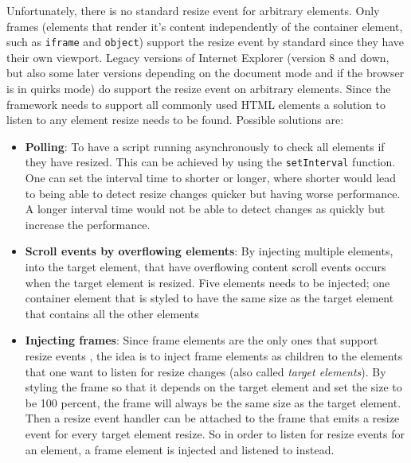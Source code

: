\documentclass[a4paper,11pt]{kth-mag}
\newcommand{\code}[1]{\texttt{#1}}
\begin{document}
          Unfortunately, there is no standard resize event for arbitrary \glspl{element}.
          Only frames (\glspl{element} that render it's content independently of the container \gls{element}, such as \code{iframe} and \code{object}) support the resize event by standard since they have their own \gls{viewport}.
          Legacy versions of Internet Explorer (version 8 and down, but also some later versions depending on the \gls{document} mode and if the \gls{browser} is in quirks mode) do support the resize event on arbitrary \glspl{element}.
          Since the framework needs to support all commonly used \gls{HTML} \glspl{element} a solution to listen to any \gls{element} resize needs to be found.
          Possible solutions are:
          \begin{itemize}
            \item \textbf{Polling}:
              To have a script running asynchronously to check all \glspl{element} if they have resized.
              This can be achieved by using the \code{setInterval} function.
              One can set the interval time to shorter or longer, where shorter would lead to being able to detect resize changes quicker but having worse performance.
              A longer interval time would not be able to detect changes as quickly but increase the performance.
            \item \textbf{Scroll events by overflowing \glspl{element}}:
              By injecting multiple \glspl{element}, into the target \gls{element}, that have overflowing content scroll events occurs when the target \gls{element} is resized.
              Five \glspl{element} needs to be injected; one container \gls{element} that is styled to have the same size as the target \gls{element} that contains all the other \glspl{element}
            \item \textbf{Injecting frames}:
              Since frame \glspl{element} are the only ones that support resize events , the idea is to inject frame \glspl{element} as children to the \glspl{element} that one want to listen for resize changes (also called \emph{target \glspl{element}}).
              By styling the frame so that it depends on the target \gls{element} and set the size to be 100 percent, the frame will always be the same size as the target element.
              Then a resize event handler can be attached to the frame that emits a resize event for every target \gls{element} resize.
              So in order to listen for resize events for an element, a frame \gls{element} is injected and listened to instead.
          \end{itemize}
\end{document}
